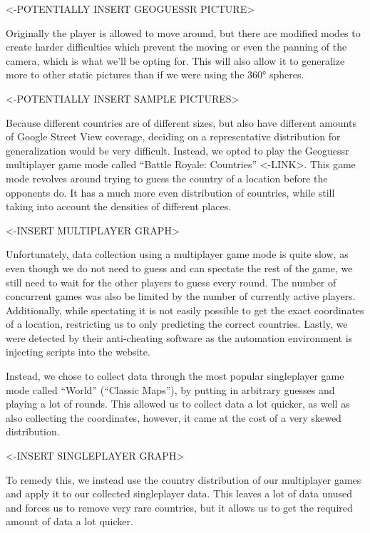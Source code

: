 \documentclass{article}
\begin{document}
\textless-POTENTIALLY INSERT GEOGUESSR PICTURE\textgreater{}

Originally the player is allowed to move around, but there are modified
modes to create harder difficulties which prevent the moving or even the
panning of the camera, which is what we'll be opting for. This will also
allow it to generalize more to other static pictures than if we were
using the 360° spheres.

\textless-POTENTIALLY INSERT SAMPLE PICTURES\textgreater{}

Because different countries are of different sizes, but also have
different amounts of Google Street View coverage, deciding on a
representative distribution for generalization would be very difficult.
Instead, we opted to play the Geoguessr multiplayer game mode called
``Battle Royale: Countries'' \textless-LINK\textgreater. This game mode
revolves around trying to guess the country of a location before the
opponents do. It has a much more even distribution of countries, while
still taking into account the densities of different places.

\textless-INSERT MULTIPLAYER GRAPH\textgreater{}

Unfortunately, data collection using a multiplayer game mode is quite
slow, as even though we do not need to guess and can spectate the rest
of the game, we still need to wait for the other players to guess every
round. The number of concurrent games was also be limited by the number
of currently active players. Additionally, while spectating it is not
easily possible to get the exact coordinates of a location, restricting
us to only predicting the correct countries. Lastly, we were detected by
their anti-cheating software as the automation environment is injecting
scripts into the website.

Instead, we chose to collect data through the most popular singleplayer
game mode called ``World'' (``Classic Maps''), by putting in arbitrary
guesses and playing a lot of rounds. This allowed us to collect data a
lot quicker, as well as also collecting the coordinates, however, it
came at the cost of a very skewed distribution.

\textless-INSERT SINGLEPLAYER GRAPH\textgreater{}

To remedy this, we instead use the country distribution of our
multiplayer games and apply it to our collected singleplayer data. This
leaves a lot of data unused and forces us to remove very rare countries,
but it allows us to get the required amount of data a lot quicker.
\end{document}
